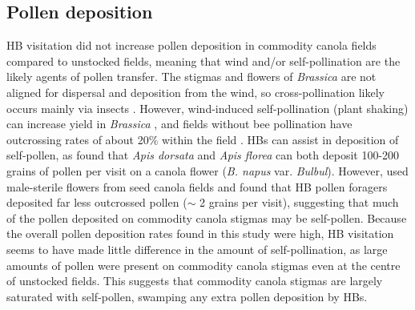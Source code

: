 \documentclass[12pt]{article} %
\begin{document}
\subsection*{Pollen deposition}
HB visitation did not increase pollen deposition in commodity canola fields compared to unstocked fields, meaning that wind and/or self-pollination are the likely agents of pollen transfer.
The stigmas and flowers of \emph{Brassica} are not aligned for dispersal and deposition from the wind, so cross-pollination likely occurs mainly via insects \citep{mesquida1982,cresswell2004}.
However, wind-induced self-pollination (plant shaking) can increase yield in \textit{Brassica} \citep{williams1986, mesquida1988c}, and fields without bee pollination have outcrossing rates of about 20\% within the field \citep{rakow1987,becker1992}.
HBs can assist in deposition of self-pollen, as \citet{ali2011} found that \textit{Apis dorsata} and \textit{Apis florea} can both deposit 100-200 grains of pollen per visit on a canola flower (\emph{B. napus} var. \emph{Bulbul}).
However, \citet{waytesMsc} used male-sterile flowers from seed canola fields and found that HB pollen foragers deposited far less outcrossed pollen ($\sim$ 2 grains per visit), suggesting that much of the pollen deposited on commodity canola stigmas may be self-pollen. 
Because the overall pollen deposition rates found in this study were high, HB visitation seems to have made little difference in the amount of self-pollination, as large amounts of pollen were present on commodity canola stigmas even at the centre of unstocked fields.
This suggests that commodity canola stigmas are largely saturated with self-pollen, swamping any extra pollen deposition by HBs.
\end{document}
